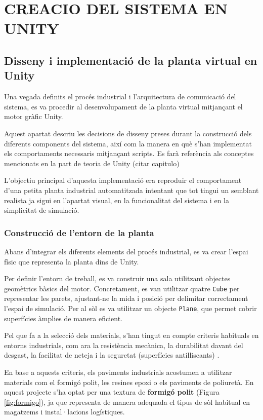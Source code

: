 \documentclass[12pt,a4paper]{report}
\begin{document}
\chapter{CREACIO DEL SISTEMA EN UNITY}
\section{Disseny i implementació de la planta virtual en Unity}

Una vegada definits el procés industrial i l'arquitectura de comunicació del sistema, es va procedir al desenvolupament de la planta virtual mitjançant el motor gràfic Unity.

Aquest apartat descriu les decisions de disseny preses durant la construcció dels diferents components del sistema, així com la manera en què s'han implementat els comportaments necessaris mitjançant scripts. Es farà referència als conceptes mencionats en la part de teoria de Unity (citar capitulo)

L'objectiu principal d'aquesta implementació  era reproduir el comportament d'una petita planta industrial automatitzada intentant que tot tingui un semblant realista ja sigui en l'apartat visual, en la funcionalitat del sistema i en la simplicitat de simulació.

\subsection{Construcció de l'entorn de la planta} 

Abans d'integrar els diferents elements del procés industrial, es va crear l'espai físic que representa la planta dins de Unity.

Per definir l'entorn de treball, es va construir una sala utilitzant objectes geomètrics bàsics del motor. Concretament, es van utilitzar quatre \texttt{Cube} per representar les parets, ajustant-ne la mida i posició per delimitar correctament l'espai de simulació. Per al sòl es va utilitzar un objecte \texttt{Plane}, que permet cobrir superfícies àmplies de manera eficient.

Pel que fa a la selecció dels materials, s'han tingut en compte criteris habituals en entorns industrials, com ara la resistència mecànica, la durabilitat davant del desgast, la facilitat de neteja i la seguretat (superfícies antilliscants) \cite{industrial_floor_molins,paviments_sika}.

En base a aquests criteris, els paviments industrials acostumen a utilitzar materials com el formigó polit, les resines epoxi o els paviments de poliuretà. En aquest projecte s'ha optat per una textura de \textbf{formigó polit} (Figura \ref{fig:formigo}), ja que representa de manera adequada el tipus de sòl habitual en magatzems i instal·lacions logístiques.
\end{document}
